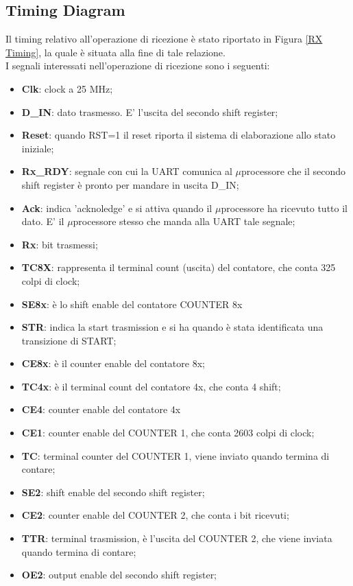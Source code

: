 \documentclass[a4paper, titlepage]{article}
\begin{document}
\subsection{Timing Diagram}
Il timing relativo all'operazione di ricezione è stato riportato in Figura \ref{RX Timing}, la quale è situata alla fine di tale relazione.\\
I segnali interessati nell’operazione di ricezione sono i  seguenti:
\begin{itemize}
\item 	\textbf{Clk}: clock a 25 MHz;
\item 	\textbf{D\_IN}: dato trasmesso. E' l'uscita del secondo shift register;
\item \textbf{Reset}: quando RST=1 il reset riporta il sistema di elaborazione allo stato iniziale;
\item 	\textbf{Rx\_RDY}: segnale con cui la UART comunica al $\mu$processore che il secondo shift register è pronto per mandare in uscita D\_IN;
\item 	\textbf{Ack}: indica 'acknoledge' e si attiva quando il $\mu$processore ha ricevuto tutto il dato. E' il $\mu$processore stesso che manda alla UART tale segnale;
\item 	\textbf{Rx}: bit trasmessi;
\item 	\textbf{TC8X}: rappresenta il terminal count (uscita) del contatore, che conta 325 colpi di clock;
\item 	\textbf{SE8x}: è lo shift enable del contatore COUNTER 8x 
\item 	\textbf{STR}: indica la start trasmission e si ha quando è stata identificata una transizione di START;
\item 	\textbf{CE8x}: è il counter enable del contatore 8x;
\item 	\textbf{TC4x}: è il terminal count del contatore 4x, che conta 4 shift;
\item 	\textbf{CE4}: counter enable del contatore 4x
\item 	\textbf{CE1}: counter enable del COUNTER 1, che conta 2603 colpi di clock;
\item 	\textbf{TC}: terminal counter del COUNTER 1, viene inviato quando termina di contare;
\item 	\textbf{SE2}: shift enable del secondo shift register;
\item 	\textbf{CE2}: counter enable del COUNTER 2, che conta i bit ricevuti;
\item 	\textbf{TTR}: terminal trasmission, è l'uscita del COUNTER 2, che viene inviata quando termina di contare;
\item 	\textbf{OE2}: output enable del secondo shift register;
\end{itemize}
\end{document}
